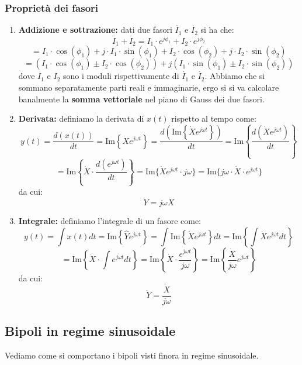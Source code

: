 \documentclass[a4paper,11pt]{article}
\begin{document}
\subsubsection{Proprietà dei fasori}
\begin{enumerate}
	\item \textbf{Addizione e sottrazione:} dati due fasori $\dot{I_1}$ e $\dot{I_2}$ si ha che:
		$$
		\dot{I_1} + \dot{I_2} = I_1 \cdot e^{j\phi_1} + I_2 \cdot e^{j\phi_2}
		$$
		$$
		= I_1 \cdot \cos(\phi_1) + j \cdot I_1 \cdot \sin(\phi_1) + I_2 \cdot \cos(\phi_2) + j \cdot I_2 \cdot \sin(\phi_2)
		$$
		$$
		= \left( I_1 \cdot \cos(\phi_1) \pm I_2 \cdot \cos(\phi_2) \right) + j (I_1 \cdot \sin(\phi_1) \pm I_2 \cdot \sin(\phi_2))
		$$
		dove $I_1$ e $I_2$ sono i moduli rispettivamente di $\dot{I_1}$ e $\dot{I_2}$.
		Abbiamo che si sommano separatamente parti reali e immaginarie, ergo si si va calcolare banalmente la \textbf{somma vettoriale} nel piano di Gauss dei due fasori.
	\item \textbf{Derivata:} definiamo la derivata di $x(t)$ rispetto al tempo come:
		$$
		y(t) = \frac{d\left(x(t)\right)}{dt} = \mathrm{Im}\left\{ \dot{X} e^{j \omega t} \right\} = \frac{d\left( \mathrm{Im}\left\{\dot{X}e^{j\omega t}\right\} \right)}{dt} = \mathrm{Im}\left\{ \frac{d\left( \dot{X} e^{j\omega t} \right)}{dt} \right\} 
		$$
		$$
		= \mathrm{Im}\left\{ \dot{X} \cdot \frac{d \left( e^{j \omega t} \right)}{dt} \right\} = \mathrm{Im} \{ \dot{X} e^{j \omega t} \cdot j \omega \} = \mathrm{Im} \{ j\omega \cdot \dot{X} \cdot e^{j\omega t} \}
		$$
		da cui:
		$$
		\dot{Y} = j \omega \dot{X}
		$$
	\item \textbf{Integrale:} definiamo l'integrale di un fasore come:
		$$
		y(t) = \int x(t) dt = \mathrm{Im}\left\{ \hat{Y} e^{j\omega t} \right\} = \int \mathrm{Im} \left\{ \dot{X} e^{j\omega t} \right\} dt = \mathrm{Im} \left\{ \int \dot{X} e^{j \omega t} dt \right\} 
		$$
		$$
		= \mathrm{Im} \left\{ \dot{X} \cdot \int e^{j \omega t} dt \right\} = \mathrm{Im} \left\{ \dot{X} \cdot \frac{e^{j \omega t}}{j\omega} \right\} = \mathrm{Im}\left\{ \frac{\dot{X}}{j\omega} e^{j \omega t} \right\}
		$$
		da cui:
		$$
		\dot{Y} = \frac{\dot{X}}{j\omega}
		$$
\end{enumerate}

\subsection{Bipoli in regime sinusoidale}
Vediamo come si comportano i bipoli visti finora in regime sinusoidale.
\end{document}
